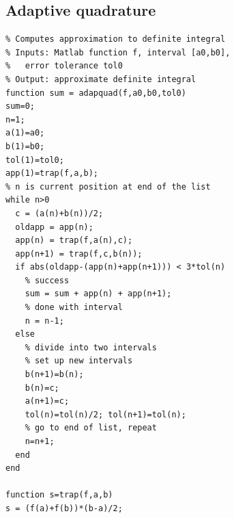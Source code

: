 \documentclass[12pt,letterpaper,noanswers]{exam}
\begin{document}
\subsection*{Adaptive quadrature}

\begin{lstlisting}[basicstyle=\small]
% From Sauer: program 5.2 Adaptive Quadrature
% Computes approximation to definite integral
% Inputs: Matlab function f, interval [a0,b0], 
%   error tolerance tol0
% Output: approximate definite integral
function sum = adapquad(f,a0,b0,tol0)
sum=0; 
n=1; 
a(1)=a0; 
b(1)=b0; 
tol(1)=tol0; 
app(1)=trap(f,a,b);
% n is current position at end of the list
while n>0           
  c = (a(n)+b(n))/2;
  oldapp = app(n);
  app(n) = trap(f,a(n),c);
  app(n+1) = trap(f,c,b(n));
  if abs(oldapp-(app(n)+app(n+1))) < 3*tol(n)
    % success
	sum = sum + app(n) + app(n+1);
	% done with interval
	n = n-1;                         
  else
    % divide into two intervals
    % set up new intervals
	b(n+1)=b(n); 
	b(n)=c;
	a(n+1)=c;
	tol(n)=tol(n)/2; tol(n+1)=tol(n);
	% go to end of list, repeat
	n=n+1;                         
  end
end

function s=trap(f,a,b)
s = (f(a)+f(b))*(b-a)/2;

\end{lstlisting}







\end{document}
